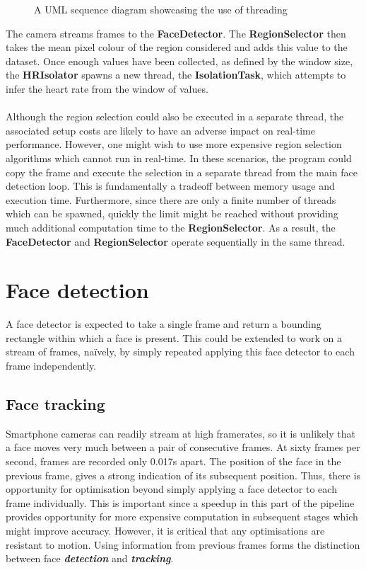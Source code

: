 \begin{figure}[H]
    \centering
    
   \caption{A UML sequence diagram showcasing the use of threading} 
\end{figure}
\noindent
The camera streams frames to the \textbf{FaceDetector}. The \textbf{RegionSelector} then takes the mean pixel colour of the region considered and adds this value to the dataset. Once enough values have been collected, as defined by the window size, the \textbf{HRIsolator} spawns a new thread, the \textbf{IsolationTask}, which attempts to infer the heart rate from the window of values. 
\\ \\
Although the region selection could also be executed in a separate thread, the associated setup costs are likely to have an adverse impact on real-time performance. However, one might wish to use more expensive region selection algorithms which cannot run in real-time. In these scenarios, the program could copy the frame and execute the selection in a separate thread from the main face detection loop. This is fundamentally a tradeoff between memory usage and execution time. Furthermore, since there are only a finite number of threads which can be spawned, quickly the limit might be reached without providing much additional computation time to the \textbf{RegionSelector}. As a result, the \textbf{FaceDetector} and \textbf{RegionSelector} operate sequentially in the same thread.
\section{Face detection}
A face detector is expected to take a single frame and return a bounding rectangle within which a face is present. This could be extended to work on a stream of frames, naïvely, by simply repeated applying this face detector to each frame independently.

\subsection{Face tracking}
\label{section:face_tracking_impl}
Smartphone cameras can readily stream at high framerates, so it is unlikely that a face moves very much between a pair of consecutive frames. At sixty frames per second, frames are recorded only 0.017s apart. The position of the face in the previous frame, gives a strong indication of its subsequent position. Thus, there is opportunity for optimisation beyond simply applying a face detector to each frame individually. This is important since a speedup in this part of the pipeline provides opportunity for more expensive computation in subsequent stages which might improve accuracy. However, it is critical that any optimisations are resistant to motion. Using information from previous frames forms the distinction between face \textbf{\textit{detection}} and \textbf{\textit{tracking}}.

